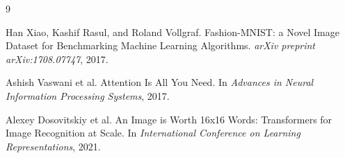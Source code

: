 \clearpage
\begin{thebibliography}{9}

Han Xiao, Kashif Rasul, and Roland Vollgraf.
\newblock Fashion-MNIST: a Novel Image Dataset for Benchmarking Machine Learning Algorithms.
\newblock \emph{arXiv preprint arXiv:1708.07747}, 2017.

Ashish Vaswani et al.
\newblock Attention Is All You Need.
\newblock In \emph{Advances in Neural Information Processing Systems}, 2017.

Alexey Dosovitskiy et al.
\newblock An Image is Worth 16x16 Words: Transformers for Image Recognition at Scale.
\newblock In \emph{International Conference on Learning Representations}, 2021.

\end{thebibliography}
